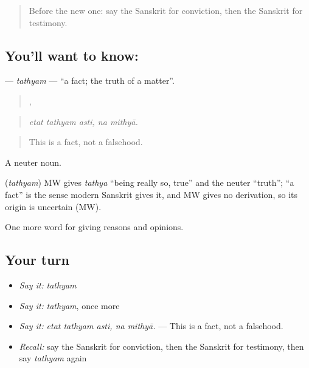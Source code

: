\label{lesson:SA-C345-tathyam}



\begin{quote}
Before the new one: say the Sanskrit for conviction, then the Sanskrit for testimony.
\end{quote}

\subsection*{You'll want to know: }
\textbf{} — \emph{tathyam} — \textquotedblleft{}a fact; the truth of a matter\textquotedblright{}.

\begin{quote}
  ,  
\end{quote}

\begin{quote}
\emph{etat tathyam asti, na mithyā.}
\end{quote}

\begin{quote}
This is a fact, not a falsehood.
\end{quote}

A neuter noun.

\begin{cousinweb}
\textbf{} (\emph{tathyam}) MW gives \emph{tathya} \textquotedblleft{}being really so, true\textquotedblright{} and the neuter \textquotedblleft{}truth\textquotedblright{}; \textquotedblleft{}a fact\textquotedblright{} is the sense modern Sanskrit gives it, and MW gives no derivation, so its origin is uncertain (MW).
\end{cousinweb}

\begin{grammarlens}[title={What you've built}]
One more word for giving reasons and opinions.
\end{grammarlens}

\subsection*{Your turn}
\begin{itemize}
\raggedright
  \item \emph{Say it:} \emph{tathyam}
  \item \emph{Say it:} \emph{tathyam}, once more
  \item \emph{Say it:} \emph{etat tathyam asti, na mithyā.} — This is a fact, not a falsehood.
  \item \emph{Recall:} say the Sanskrit for conviction, then the Sanskrit for testimony, then say \emph{tathyam} again
\end{itemize}

